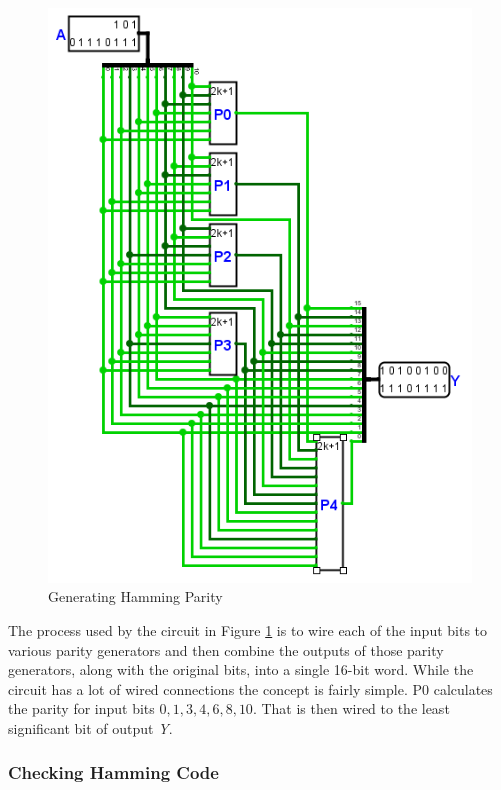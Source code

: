 \begin{figure}[H]
	\centering
	\includegraphics[width=\maxwidth{.95\linewidth}]{gfx/08_21}
	\caption{Generating Hamming Parity}
	\label{fig:08_21}
\end{figure}

The process used by the circuit in Figure \ref{fig:08_21} is to wire each of the input bits to various parity generators and then combine the outputs of those parity generators, along with the original bits, into a single 16-bit word. While the circuit has a lot of wired connections the concept is fairly simple. \textsf{P0} calculates the parity for input bits $ 0, 1, 3, 4, 6, 8, 10 $. That is then wired to the least significant bit of output \emph{Y}.

\subsubsection{Checking Hamming Code}
\label{CL:subsubsec:checking_hamming_code}

